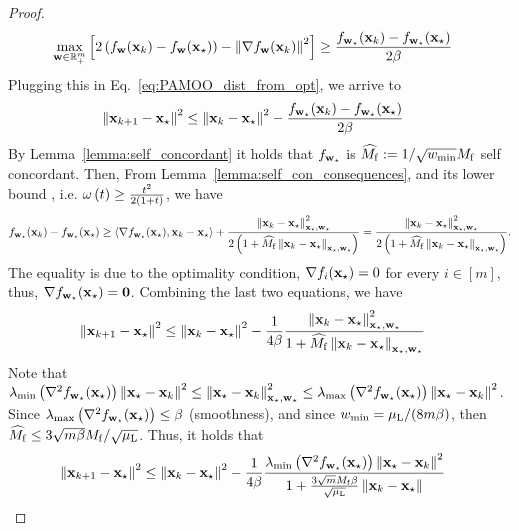 \begin{proof}
\begin{align*}
     \max_{\w\in \reals_+^m} \left[ 2\brac{f_{\w}(\x_k)- f_{\w} (\x_\star)} - \enorm{\nabla f_{\w}(\x_k)}^2 \right] & \geq \frac{f_{\w_\star}(\x_k)- f_{\w_\star} (\x_\star)}{2 \beta} 
\end{align*}
Plugging this in Eq.~\eqref{eq:PAMOO_dist_from_opt}, we arrive to 
\begin{align*}
    \enorm{\x_{k+1}-\x_\star}^2 &\leq \enorm{\x_k-\x_\star}^2 -  \frac{ f_{\w_\star}(\x_k)- f_{\w_\star} (\x_\star)}{2 \beta}
\end{align*}
By Lemma~\ref{lemma:self_concordant} it holds that $f_{\w_\star}$ is $\widehat{M_{\mathrm{f}}}:=1/\sqrt{\wmin} M_{\mathrm{f}}$ self concordant. Then, From Lemma~\ref{lemma:self_con_consequences}, and its lower bound , i.e. $\omega\brac{t} \geq \frac{t^2}{2\brac{1+t}}$, we have
\begin{align*}
       f_{\w_\star}(\x_k) -f_{\w_\star}(\x_\star) \geq \inner{\nabla f_{\w_\star}(\x_\star)}{\x_k - \x_\star} +  \frac{\enorm{\x_k - \x_\star}_{ \x_\star,\w_\star}^2}{2\brac{1+\widehat{M_{\mathrm{f}}}\enorm{\x_k - \x_\star}_{\x_\star,\w_\star}}} = \frac{\enorm{\x_k - \x_\star}_{ \x_\star,\w_\star}^2}{2\brac{1+\widehat{M_{\mathrm{f}}}\enorm{\x_k - \x_\star}_{\x_\star,\w_\star}}}.
\end{align*}
The equality is due to the optimality condition, $\nabla f_i(\x_\star)=0$ for every $i \in [m]$, thus, $\nabla f_{\w_\star}(\x_\star) = \bold{0}$.
Combining the last two equations, we have 
\begin{align*}
    \enorm{\x_{k+1}-\x_\star}^2 &\leq \enorm{\x_k-\x_\star}^2 -  \frac{1}{4 \beta} \frac{\enorm{\x_k - \x_\star}_{ \x_\star,\w_\star}^2}{1+\widehat{M_{\mathrm{f}}}\enorm{\x_k - \x_\star}_{\x_\star,\w_\star}}
\end{align*}
Note that $\lambda_{\min}\brac{\nabla^2 f_{\w_\star}(\x_\star)} \enorm{\x_\star - \x_k}^2 \leq \enorm{\x_\star - \x_k}_{\x_\star,\w_\star}^2 \leq \lambda_{\max}\brac{\nabla^2 f_{\w_\star}(\x_\star)} \enorm{\x_\star - \x_k}^2$. Since $\lambda_{\max}\brac{\nabla^2 f_{\w_\star}(\x_\star)} \leq \beta$ (smoothness), and since $w_{\min}= \mulocal /(8m\beta)$, then $\widehat{M_{\mathrm{f}}} \leq 3\sqrt{m\beta}M_{\mathrm{f}} /\sqrt{\mulocal}$. Thus, it holds that
\begin{align*}
    \enorm{\x_{k+1}-\x_\star}^2 &\leq \enorm{\x_k-\x_\star}^2 -  \frac{1}{4 \beta} \frac{\lambda_{\min}\brac{\nabla^2 f_{\w_\star}(\x_\star)} \enorm{\x_\star - \x_k}^2}{1+ \frac{3\sqrt{m} M_{\mathrm{f}} \beta}{\sqrt{\mulocal}}  \enorm{\x_k - \x_\star}}
\end{align*}

\end{proof}
